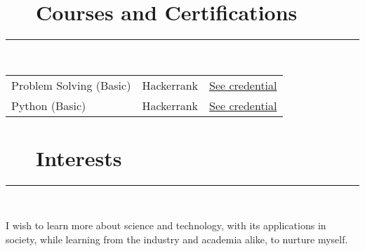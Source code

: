 \documentclass{article}
\begin{document}
\section*{\faLaptop ~~ Courses and Certifications} 
\hrule

\
\newline
\

\begin{tabular}{l l l}

    Problem Solving (Basic) & Hackerrank 
                            & \href{https://www.hackerrank.com/certificates/8d1db5b492de}{See credential} \\
    Python (Basic)  & Hackerrank 
                    & \href{https://www.hackerrank.com/certificates/46699d054d5a}{See credential} \\ 
\end{tabular}

\section*{\faHeartO ~~ Interests} 
\hrule

\
\newline
\

\noindent I wish to learn more about science and technology, with its applications in society, while learning from the industry and academia alike, to nurture myself.
\end{document}
